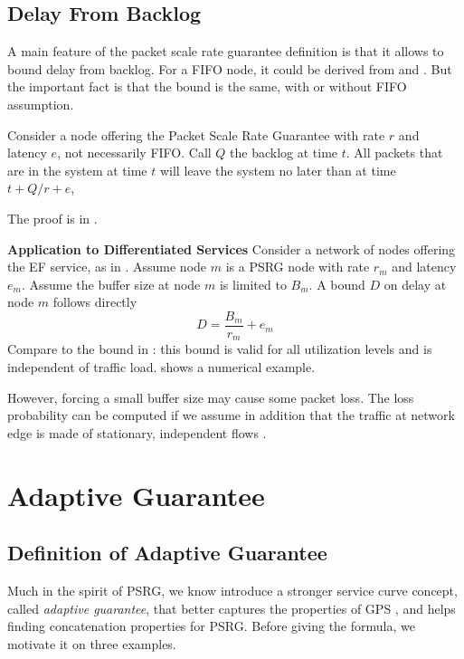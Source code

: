 \subsection{Delay From Backlog}
 A main feature of the packet scale rate
guarantee definition is that it allows to bound delay from
backlog. For a FIFO node, it could be derived from
 and . But the
important fact is that the bound is the same, with or without
FIFO assumption.

\begin{theorem} 
Consider a node offering the Packet Scale Rate Guarantee with
rate $r$ and latency $e$, not necessarily FIFO. Call $Q$ the
backlog at time $t$. All packets that are in the system at
time $t$ will leave the system no later than at time
$t+Q/r+e$,
\end{theorem}
The proof is in .


\textbf{Application to Differentiated Services} Consider a
network of nodes offering the EF service, as in
. Assume node $m$ is a PSRG node with rate
$r_m$ and latency $e_m$. Assume the buffer size at node $m$ is
limited to $B_m$. A bound $D$ on delay at node $m$ follows
directly
$$
D=\frac{B_m}{r_m} + e_m
$$
Compare to the bound in : this bound is
valid for all utilization levels and is independent of traffic
load.  shows a numerical example.
\begin{figure}[!htbp]
\end{figure}

However, forcing a small buffer size may cause some packet
loss. The loss probability can be computed if we assume in
addition that the traffic at network edge is made of
stationary, independent flows \cite{VL2002EF}.

\section{Adaptive Guarantee}
\subsection{Definition of Adaptive Guarantee} Much in the spirit of PSRG, we know introduce a
stronger service curve concept, called \emph{adaptive
guarantee}, that better captures the properties of GPS
\cite{oki98,cruzADAP}, and helps finding concatenation
properties for PSRG. Before giving the formula, we motivate it
on three examples.

